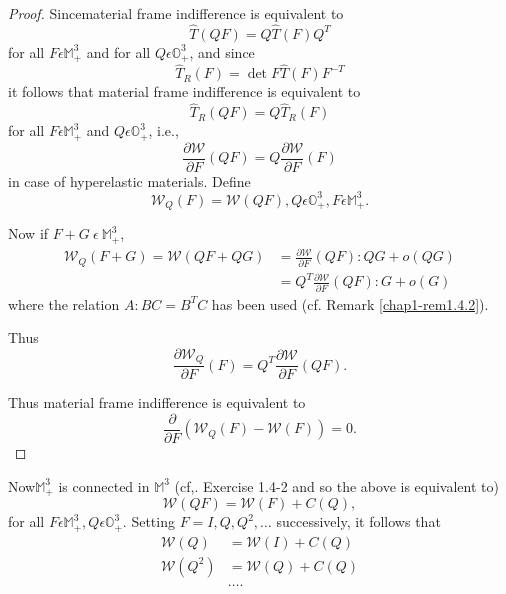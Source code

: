 \begin{proof}
  Since\pageoriginale material frame indifference is equivalent to 
  $$
  \hat{T} (QF) = Q \hat{T} (F) Q^{T}
  $$
  for all $F \epsilon \mathbb{M}^{3}_{+}$ and for all $Q \epsilon
  \mathbb{O}^{3}_{+}$, and since 
  $$
  \hat{T}_{R}(F) = \det F \hat{T} (F) F^{-T}
  $$
  it follows that material frame indifference is equivalent to 
  \begin{equation*}
    \hat{T}_{R} (QF) = Q \hat{T}_{R} (F) \tag{1.4-14}\label{eq1.4-14}
  \end{equation*}
  for all $F \epsilon \mathbb{M}^{3}_{+}$ and $Q \epsilon
  \mathbb{O}^{3}_{+}$, i.e., 
  \begin{equation*}
    \frac{\partial \mathcal{W}}{\partial F} (QF) = Q \frac{\partial
      \mathcal{W}}{\partial F} (F) \tag{1.4-15} \label{eq1.4-15}
  \end{equation*}
  in case of hyperelastic materials. Define
  \begin{equation*}
    \mathcal{W}_{Q} (F) = \mathcal{W} (QF) , Q \epsilon
    \mathbb{O}^{3}_{+}, F \epsilon
    \mathbb{M}^{3}_{+}. \tag{1.4-16}\label{eq1.4-16}  
  \end{equation*}

  Now if $F + G~ \epsilon ~\mathbb{M}^{3}_{+}$, 
  \begin{align*}
    \mathcal{W}_{Q} (F+G) = \mathcal{W}(Q F + QG) & = \frac{\partial
      \mathcal{W}}{\partial F} (QF) : QG + o(QG)\\ 
    &= Q^{T} \frac{\partial \mathcal{W}}{\partial F} (QF) : G + o(G)
  \end{align*}
  where the relation $A : BC = B^{T}C$ has been used (cf. Remark
  \ref{chap1-rem1.4.2}). 
  
  Thus
  $$
  \frac{\partial \mathcal{W}_Q}{\partial F} (F) = Q^{T} \frac{\partial
    \mathcal{W}}{\partial F} (QF). 
  $$
  
  Thus material frame indifference is equivalent to 
  \begin{equation*}
    \frac{\partial}{\partial F} (\mathcal{W}_{Q}(F) - \mathcal{W} (F)) =
    0. \tag{1.4-17} \label{eq1.4-17}
  \end{equation*}
\end{proof}

Now\pageoriginale $\mathbb{M}^{3}_{+}$ is connected in
$\mathbb{M}^{3}$%
(cf,. Exercise 1.4-2 and so the above is equivalent to) 
\begin{equation*}
  \mathcal{W}(QF) = \mathcal{W}(F) + C(Q), \tag{1.4-18}\label{eq1.4-18}
\end{equation*}
for all $F \epsilon \mathbb{M}^{3}_{+}, Q \epsilon
\mathbb{O}^{3}_{+}$. Setting $F = I , Q, Q^{2}, \dots$ successively,
it follows that  
\begin{align*}
  \mathcal{W}(Q) & = \mathcal{W} (I) + C(Q)\\
  \mathcal{W}(Q^{2}) & = \mathcal{W} (Q) + C(Q)\\
  & \dots.
\end{align*}

